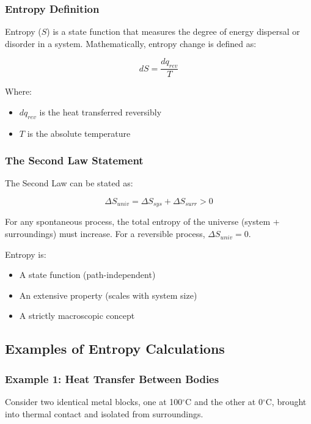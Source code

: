 \documentclass{article}
\theoremstyle{definition}
\begin{document}
\subsubsection{Entropy Definition}

Entropy ($S$) is a state function that measures the degree of energy dispersal or disorder in a system. Mathematically, entropy change is defined as:

\begin{equation}
dS = \frac{dq_{rev}}{T}
\end{equation}

Where:
\begin{itemize}
    \item $dq_{rev}$ is the heat transferred reversibly
    \item $T$ is the absolute temperature
\end{itemize}

\subsubsection{The Second Law Statement}

The Second Law can be stated as:

\begin{equation}
\Delta S_{univ} = \Delta S_{sys} + \Delta S_{surr} > 0
\end{equation}

For any spontaneous process, the total entropy of the universe (system + surroundings) must increase. For a reversible process, $\Delta S_{univ} = 0$.

Entropy is:
\begin{itemize}
    \item A state function (path-independent)
    \item An extensive property (scales with system size)
    \item A strictly macroscopic concept
\end{itemize}

\subsection{Examples of Entropy Calculations}

\subsubsection{Example 1: Heat Transfer Between Bodies}

Consider two identical metal blocks, one at 100$^\circ$C and the other at 0$^\circ$C, brought into thermal contact and isolated from surroundings.
\end{document}

